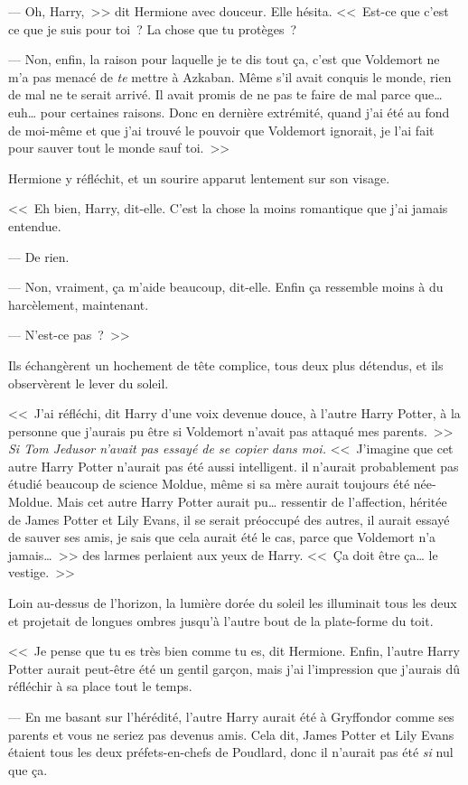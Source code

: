 --- Oh, Harry,~>> dit Hermione avec douceur. Elle hésita. <<~Est-ce que c'est ce que je suis pour toi~? La chose que tu protèges~?

--- Non, enfin, la raison pour laquelle je te dis tout ça, c'est que Voldemort ne m'a pas menacé de \emph{te} mettre à Azkaban. Même s'il avait conquis le monde, rien de mal ne te serait arrivé. Il avait promis de ne pas te faire de mal parce que… euh… pour certaines raisons. Donc en dernière extrémité, quand j'ai été au fond de moi-même et que j'ai trouvé le pouvoir que Voldemort ignorait, je l'ai fait pour sauver tout le monde sauf toi.~>>

Hermione y réfléchit, et un sourire apparut lentement sur son visage.

<<~Eh bien, Harry, dit-elle. C'est la chose la moins romantique que j'ai jamais entendue.

--- De rien.

--- Non, vraiment, ça m'aide beaucoup, dit-elle. Enfin ça ressemble moins à du harcèlement, maintenant.

--- N'est-ce pas~?~>>

Ils échangèrent un hochement de tête complice, tous deux plus détendus, et ils observèrent le lever du soleil.

<<~J'ai réfléchi, dit Harry d'une voix devenue douce, à l'autre Harry Potter, à la personne que j'aurais pu être si Voldemort n'avait pas attaqué mes parents.~>> \emph{Si Tom Jedusor n'avait pas essayé de se copier dans moi.} <<~J'imagine que cet autre Harry Potter n'aurait pas été aussi intelligent. il n'aurait probablement pas étudié beaucoup de science Moldue, même si sa mère aurait toujours été née-Moldue. Mais cet autre Harry Potter aurait pu… ressentir de l'affection, héritée de James Potter et Lily Evans, il se serait préoccupé des autres, il aurait essayé de sauver ses amis, je sais que cela aurait été le cas, parce que Voldemort n'a jamais…~>> des larmes perlaient aux yeux de Harry. <<~Ça doit être ça… le vestige.~>>

Loin au-dessus de l'horizon, la lumière dorée du soleil les illuminait tous les deux et projetait de longues ombres jusqu'à l'autre bout de la plate-forme du toit.

<<~Je pense que tu es très bien comme tu es, dit Hermione. Enfin, l'autre Harry Potter aurait peut-être été un gentil garçon, mais j'ai l'impression que j'aurais dû réfléchir à sa place tout le temps.

--- En me basant sur l'hérédité, l'autre Harry aurait été à Gryffondor comme ses parents et vous ne seriez pas devenus amis. Cela dit, James Potter et Lily Evans étaient tous les deux préfets-en-chefs de Poudlard, donc il n'aurait pas été \emph{si} nul que ça.


